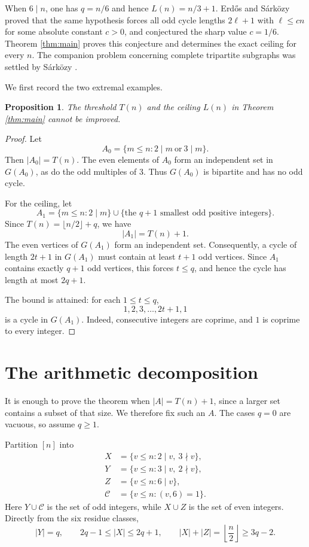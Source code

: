 \documentclass{article}
\newtheorem{proposition}[theorem]{Proposition}
\theoremstyle{remark}
\newcommand{\Ccal}{\mathcal{C}}
\begin{document}
When \(6\mid n\), one has \(q=n/6\) and hence \(L(n)=n/3+1\).
Erdős and Sárközy \cite{ES97} proved that the same hypothesis forces all
odd cycle lengths \(2\ell+1\) with \(\ell\leq cn\) for some absolute
constant \(c>0\), and conjectured the sharp value \(c=1/6\). Theorem
\ref{thm:main} proves this conjecture and determines the exact ceiling
for every \(n\). The companion problem concerning complete tripartite
subgraphs was settled by Sárközy \cite{S99}.

We first record the two extremal examples.

\begin{proposition}\label{prop:sharpness}
The threshold \(T(n)\) and the ceiling \(L(n)\) in Theorem
\ref{thm:main} cannot be improved.
\end{proposition}

\begin{proof}
Let
\[
 A_0=\{m\leq n:2\mid m\ \text{or}\ 3\mid m\}.
\]
Then \(|A_0|=T(n)\). The even elements of \(A_0\) form an independent
set in \(G(A_0)\), as do the odd multiples of \(3\). Thus \(G(A_0)\) is
bipartite and has no odd cycle.

For the ceiling, let
\[
 A_1=\{m\leq n:2\mid m\}
     \cup\{\text{the \(q+1\) smallest odd positive integers}\}.
\]
Since \(T(n)=\lfloor n/2\rfloor+q\), we have
\[
 |A_1|=T(n)+1.
\]
The even vertices of \(G(A_1)\) form an independent set. Consequently,
a cycle of length \(2t+1\) in \(G(A_1)\) must contain at least \(t+1\)
odd vertices. Since \(A_1\) contains exactly \(q+1\) odd vertices, this
forces \(t\leq q\), and hence the cycle has length at most \(2q+1\).

The bound is attained: for each \(1\leq t\leq q\),
\[
 1,2,3,\ldots,2t+1,1
\]
is a cycle in \(G(A_1)\). Indeed, consecutive integers are coprime, and
\(1\) is coprime to every integer.
\end{proof}

\section{The arithmetic decomposition}

It is enough to prove the theorem when \(|A|=T(n)+1\), since a larger
set contains a subset of that size. We therefore fix such an \(A\).
The cases \(q=0\) are vacuous, so assume \(q\geq1\).

Partition \([n]\) into
\[
\begin{aligned}
 X&=\{v\leq n:2\mid v,\ 3\nmid v\},\\
 Y&=\{v\leq n:3\mid v,\ 2\nmid v\},\\
 Z&=\{v\leq n:6\mid v\},\\
 \Ccal&=\{v\leq n:(v,6)=1\}.
\end{aligned}
\]
Here \(Y\cup\Ccal\) is the set of odd integers, while \(X\cup Z\) is the
set of even integers. Directly from the six residue classes,
\begin{equation}\label{eq:part-sizes}
 |Y|=q,\qquad
 2q-1\leq |X|\leq2q+1,\qquad
 |X|+|Z|=\left\lfloor\frac n2\right\rfloor\geq3q-2.
\end{equation}
\end{document}
